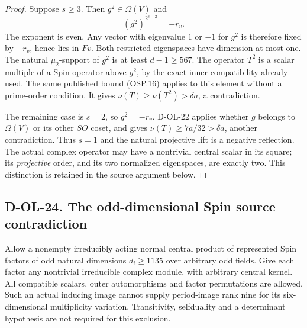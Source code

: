 \begin{proof}
Suppose $s\ge3$.  Then $g^2\in\Omega(V)$ and
\[
                 (g^2)^{2^{s-2}}=-r_v .
 \tag{OSP.18}
\]
The exponent is even.  Any vector with eigenvalue $1$
or $-1$ for $g^2$ is therefore fixed by $-r_v$, hence
lies in $Fv$.  Both restricted eigenspaces have dimension
at most one.  The natural $\mu_2$-support of $g^2$ is
at least $d-1\ge567$.  The operator $T^2$ is a scalar
multiple of a Spin operator above $g^2$, by the exact
inner compatibility already used.  The same published
bound (OSP.16) applies to this element without a
prime-order condition.  It gives
$\nu(T)\ge\nu(T^2)>\delta a$, a contradiction.

The remaining case is $s=2$, so $g^2=-r_v$.
D-OL-22 applies whether $g$ belongs to $\Omega(V)$
or its other $SO$ coset, and gives
$\nu(T)\ge7a/32>\delta a$, another contradiction.
Thus $s=1$ and the natural projective lift is a negative
reflection.  The actual complex operator may have a
nontrivial central scalar in its square; its \emph{projective}
order, and its two normalized eigenspaces, are exactly two.
This distinction is retained in the source argument below.
\end{proof}

\subsection*{D-OL-24. The odd-dimensional Spin source contradiction}

\begin{theorem}[D-OL-24]
Allow a nonempty irreducibly acting normal central product of
represented Spin factors of odd natural dimensions $d_i\ge1135$
over arbitrary odd fields.  Give each factor any nontrivial
irreducible complex module, with arbitrary central kernel.
All compatible scalars, outer automorphisms and factor
permutations are allowed.  Such an actual inducing image
cannot supply period-image rank nine for its six-dimensional
multiplicity variation.  Transitivity, selfduality and a
determinant hypothesis are not required for this exclusion.
\end{theorem}

